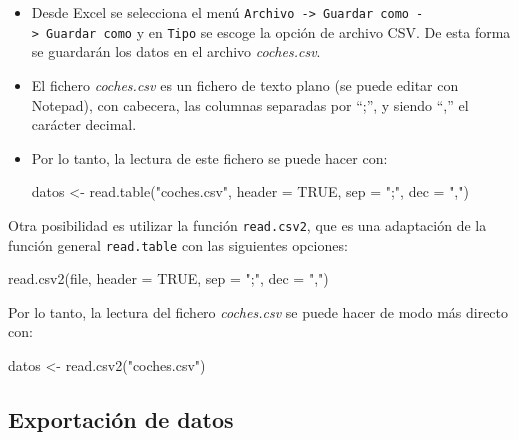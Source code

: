 \documentclass[
]{book}
\newenvironment{Shaded}{\begin{snugshade}}{\end{snugshade}}
\newcommand{\AttributeTok}[1]{\textcolor[rgb]{0.77,0.63,0.00}{#1}}
\newcommand{\ConstantTok}[1]{\textcolor[rgb]{0.00,0.00,0.00}{#1}}
\newcommand{\FunctionTok}[1]{\textcolor[rgb]{0.00,0.00,0.00}{#1}}
\newcommand{\NormalTok}[1]{#1}
\newcommand{\OtherTok}[1]{\textcolor[rgb]{0.56,0.35,0.01}{#1}}
\newcommand{\StringTok}[1]{\textcolor[rgb]{0.31,0.60,0.02}{#1}}
\theoremstyle{break}
\theoremstyle{nonumberplain}
\begin{document}
\begin{itemize}
\item
  Desde Excel se selecciona el menú
  \texttt{Archivo\ -\textgreater{}\ Guardar\ como\ -\textgreater{}\ Guardar\ como} y en \texttt{Tipo} se escoge la opción de
  archivo CSV. De esta forma se guardarán los datos en el archivo
  \emph{coches.csv}.
\item
  El fichero \emph{coches.csv} es un fichero de texto plano (se puede
  editar con Notepad), con cabecera, las columnas separadas por ``;'', y
  siendo ``,'' el carácter decimal.
\item
  Por lo tanto, la lectura de este fichero se puede hacer con:

\begin{Shaded}
\begin{Highlighting}[]
\NormalTok{datos }\OtherTok{\textless{}{-}} \FunctionTok{read.table}\NormalTok{(}\StringTok{"coches.csv"}\NormalTok{, }\AttributeTok{header =} \ConstantTok{TRUE}\NormalTok{, }\AttributeTok{sep =} \StringTok{";"}\NormalTok{, }\AttributeTok{dec =} \StringTok{","}\NormalTok{)}
\end{Highlighting}
\end{Shaded}
\end{itemize}

Otra posibilidad es utilizar la función \texttt{read.csv2}, que es
una adaptación de la función general \texttt{read.table} con las siguientes
opciones:

\begin{Shaded}
\begin{Highlighting}[]
\FunctionTok{read.csv2}\NormalTok{(file, }\AttributeTok{header =} \ConstantTok{TRUE}\NormalTok{, }\AttributeTok{sep =} \StringTok{";"}\NormalTok{, }\AttributeTok{dec =} \StringTok{","}\NormalTok{)}
\end{Highlighting}
\end{Shaded}

Por lo tanto, la lectura del fichero \emph{coches.csv} se puede hacer de modo
más directo con:

\begin{Shaded}
\begin{Highlighting}[]
\NormalTok{datos }\OtherTok{\textless{}{-}} \FunctionTok{read.csv2}\NormalTok{(}\StringTok{"coches.csv"}\NormalTok{)}
\end{Highlighting}
\end{Shaded}

\hypertarget{exportaciuxf3n-de-datos}{%
\subsection{Exportación de datos}\label{exportaciuxf3n-de-datos}}
\end{document}
